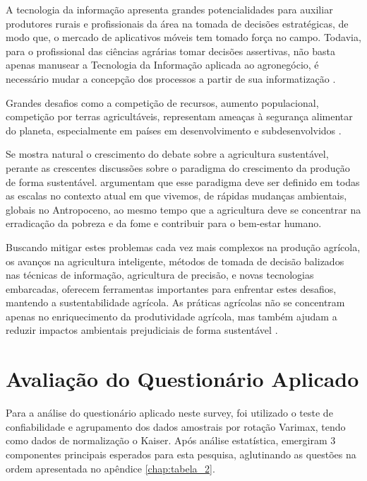 A tecnologia da informação apresenta grandes potencialidades para auxiliar produtores rurais e profissionais da área na tomada de decisões estratégicas, de modo que, o mercado de aplicativos móveis tem tomado força no campo. Todavia, para o profissional das ciências agrárias tomar decisões assertivas, não basta apenas manusear a Tecnologia da Informação aplicada ao agronegócio, é necessário mudar a concepção dos processos a partir de sua informatização \cite{ferraz_tecnologia_2017,sharma_systematic_2020}.

Grandes desafios como a competição de recursos, aumento populacional, competição por terras agricultáveis, representam ameaças à segurança alimentar do planeta, especialmente em países em desenvolvimento e subdesenvolvidos \cite{pardey_bounds_2014}.

Se mostra natural o crescimento do debate sobre a agricultura sustentável, perante as crescentes discussões sobre o paradigma do crescimento da produção de forma sustentável.
 argumentam que esse paradigma deve ser definido em todas as escalas no contexto atual em que vivemos, de rápidas mudanças ambientais, globais no Antropoceno, ao mesmo tempo que a agricultura  deve se concentrar na erradicação da pobreza e da fome e contribuir para o bem-estar humano.

Buscando mitigar estes problemas cada vez mais complexos na produção agrícola, os avanços na agricultura inteligente, métodos de tomada de decisão balizados nas técnicas de informação, agricultura de precisão, e novas tecnologias embarcadas, oferecem ferramentas importantes para enfrentar estes desafios, mantendo a sustentabilidade agrícola. As práticas agrícolas não se concentram apenas no enriquecimento da produtividade agrícola, mas também ajudam a reduzir impactos ambientais prejudiciais de forma sustentável \cite{adnan_effects_2018,rockstrom_sustainable_2017,ye_bio-organic_2020}.

\section{Avaliação do Questionário Aplicado}

Para a análise do questionário aplicado neste survey, foi utilizado o teste de confiabilidade e agrupamento dos dados amostrais por rotação Varimax, tendo como dados de normalização o Kaiser\footnotemark[1]. Após análise estatística, emergiram 3 componentes principais esperados para esta pesquisa, aglutinando as questões na ordem apresentada no apêndice \ref{chap:tabela_2}.


